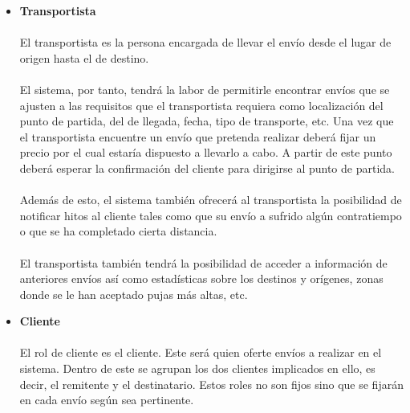 \documentclass[10pt, a4paper,spanish]{article}
\begin{document}
		\begin{itemize}


			\item{\textbf{Transportista}}

			\paragraph{}
			El transportista es la persona encargada de llevar el envío desde el lugar de origen hasta el de destino.

			\paragraph{}
			El sistema, por tanto, tendrá la labor de permitirle encontrar envíos que se ajusten a las requisitos que el transportista requiera como localización del punto de partida, del de llegada, fecha, tipo de transporte, etc. Una vez que el transportista encuentre un envío que pretenda realizar deberá fijar un precio por el cual estaría dispuesto a llevarlo a cabo. A partir de este punto deberá esperar la confirmación del cliente para dirigirse al punto de partida.

			\paragraph{}
			Además de esto, el sistema también ofrecerá al transportista la posibilidad de notificar hitos al cliente tales como que su envío a sufrido algún contratiempo o que se ha completado cierta distancia.

			\paragraph{}
			El transportista también tendrá la posibilidad de acceder a información de anteriores envíos así como estadísticas sobre los destinos y orígenes, zonas donde se le han aceptado pujas más altas, etc.


			\item{\textbf{Cliente}}
			\paragraph{}
			El rol de cliente es el cliente. Este será quien oferte envíos a realizar en el sistema. Dentro de este se agrupan los dos clientes implicados en ello, es decir, el remitente y el destinatario. Estos roles no son fijos sino que se fijarán en cada envío según sea pertinente.


\end{itemize}
\end{document}

